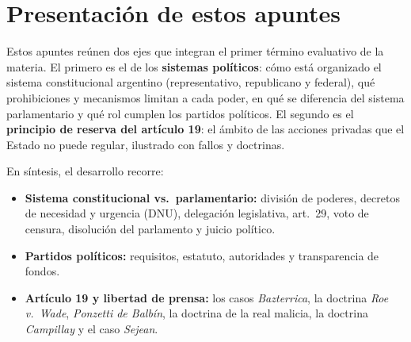 \documentclass[12pt,oneside]{book}
\begin{document}
\chapter*{Presentación de estos apuntes}

Estos apuntes reúnen dos ejes que integran el primer término evaluativo de la materia. El primero es el de los \textbf{sistemas políticos}: cómo está organizado el sistema constitucional argentino (representativo, republicano y federal), qué prohibiciones y mecanismos limitan a cada poder, en qué se diferencia del sistema parlamentario y qué rol cumplen los partidos políticos. El segundo es el \textbf{principio de reserva del artículo 19}: el ámbito de las acciones privadas que el Estado no puede regular, ilustrado con fallos y doctrinas.

En síntesis, el desarrollo recorre:

\begin{itemize}
\item \textbf{Sistema constitucional vs.\ parlamentario:} división de poderes, decretos de necesidad y urgencia (DNU), delegación legislativa, art.\ 29, voto de censura, disolución del parlamento y juicio político.
\item \textbf{Partidos políticos:} requisitos, estatuto, autoridades y transparencia de fondos.
\item \textbf{Artículo 19 y libertad de prensa:} los casos \emph{Bazterrica}, la doctrina \emph{Roe v.\ Wade}, \emph{Ponzetti de Balbín}, la doctrina de la real malicia, la doctrina \emph{Campillay} y el caso \emph{Sejean}.
\end{itemize}
\end{document}
